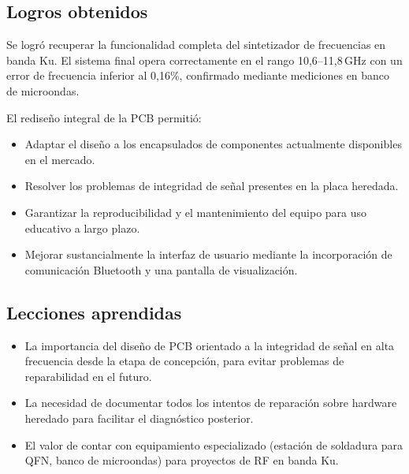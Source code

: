 \documentclass[12pt, a4paper]{article}
\begin{document}
	\subsection{Logros obtenidos}
	
	Se logró recuperar la funcionalidad completa del sintetizador de frecuencias en banda Ku. El sistema
	final opera correctamente en el rango 10{,}6–11{,}8\,GHz con un error de frecuencia inferior al
	0{,}16\%, confirmado mediante mediciones en banco de microondas.
	
	El rediseño integral de la PCB permitió:
	
	\begin{itemize}[leftmargin=*]
		\item Adaptar el diseño a los encapsulados de componentes actualmente disponibles en el mercado.
		\item Resolver los problemas de integridad de señal presentes en la placa heredada.
		\item Garantizar la reproducibilidad y el mantenimiento del equipo para uso educativo a largo plazo.
		\item Mejorar sustancialmente la interfaz de usuario mediante la incorporación de comunicación
		Bluetooth y una pantalla de visualización.
	\end{itemize}
	
	\subsection{Lecciones aprendidas}
	
	\begin{itemize}[leftmargin=*]
		\item La importancia del diseño de PCB orientado a la integridad de señal en alta frecuencia desde
		la etapa de concepción, para evitar problemas de reparabilidad en el futuro.
		\item La necesidad de documentar todos los intentos de reparación sobre hardware heredado para
		facilitar el diagnóstico posterior.
		\item El valor de contar con equipamiento especializado (estación de soldadura para QFN, banco de
		microondas) para proyectos de RF en banda Ku.
	\end{itemize}
	

	
	
	
	\newpage
	\appendix
	
\end{document}
